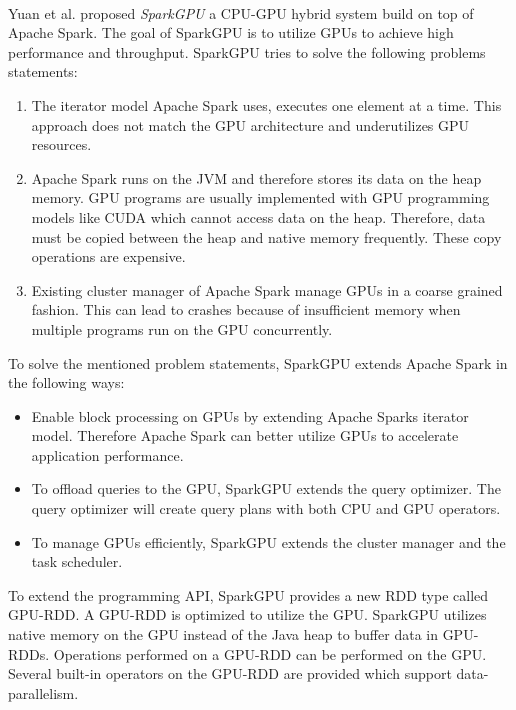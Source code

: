 \paragraph{}
Yuan et al. \cite{Yuan2016SparkGPU} proposed \textit{SparkGPU} a CPU-GPU hybrid system build on top of Apache Spark.
The goal of SparkGPU is to utilize GPUs to achieve high performance and throughput.
SparkGPU tries to solve the following problems statements:
\begin{enumerate}
\item The iterator model Apache Spark uses, executes one element at a time.
This approach does not match the GPU architecture and underutilizes GPU resources.

\item Apache Spark runs on the JVM and therefore stores its data on the heap memory.
GPU programs are usually implemented with GPU programming models like CUDA which cannot access data on the heap.
Therefore, data must be copied between the heap and native memory frequently. These copy operations are expensive.

\item Existing cluster manager of Apache Spark manage GPUs in a coarse grained fashion.
This can lead to crashes because of insufficient memory when multiple programs run on the GPU concurrently.
\end{enumerate}
To solve the mentioned problem statements, SparkGPU extends Apache Spark in the following ways:
\begin{itemize}
\item Enable block processing on GPUs by extending Apache Sparks iterator model. Therefore Apache Spark can better utilize GPUs to accelerate application performance.

\item To offload queries to the GPU, SparkGPU extends the query optimizer. The query optimizer will create query plans with both CPU and GPU operators.

\item To manage GPUs efficiently, SparkGPU extends the cluster manager and the task scheduler.
\end{itemize}
To extend the programming API, SparkGPU provides a new RDD type called GPU-RDD.
A GPU-RDD is optimized to utilize the GPU.
SparkGPU utilizes native memory on the GPU instead of the Java heap to buffer data in GPU-RDDs.
Operations performed on a GPU-RDD can be performed on the GPU. Several built-in operators on the GPU-RDD are provided which support data-parallelism.


